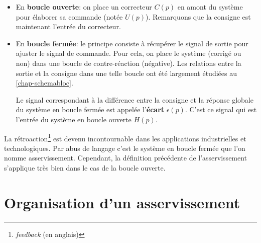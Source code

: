 \begin{itemize}
    \item En \textbf{boucle ouverte}: on place un correcteur $C(p)$
          en amont du système pour élaborer 
          sa commande (notée $U(p)$).
          Remarquons que la consigne est maintenant
          l'entrée du correcteur.
    \begin{center}
        
    \end{center}
    \item En \textbf{boucle fermée}: le principe consiste à récupérer 
          le signal de sortie pour ajuster le signal de commande. 
          Pour cela, on place le système (corrigé ou non) dans une 
          boucle de contre-réaction (négative). 
          Les relations entre la sortie et la consigne dans une telle 
          boucle ont été largement étudiées au \cref{chap-schemabloc}.
    \begin{center}
        
    \end{center}
          Le signal correspondant à la différence entre la consigne
          et la réponse globale du système en boucle fermée est
          appelée l'\textbf{écart} $\epsilon(p)$. C'est ce signal qui est
          l'entrée du système en boucle ouverte $H(p)$.
\end{itemize}
La rétroaction\footnote{\emph{feedback} (en anglais)} est devenu incontournable
dans les applications industrielles et technologiques. Par abus de langage 
c'est le système en boucle fermée que l'on nomme asservissement. Cependant, la 
définition précédente de l'asservissement s'applique très bien dans 
le cas de la boucle ouverte.
\section{Organisation d'un asservissement}

